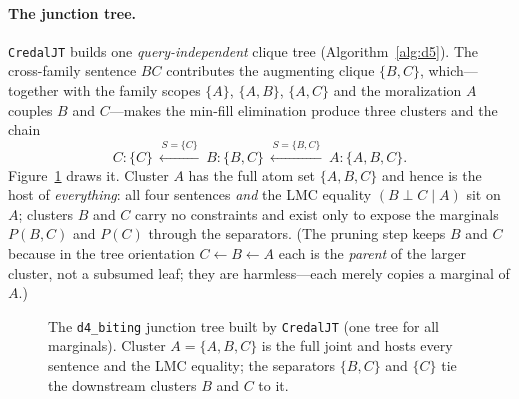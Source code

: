 \documentclass[11pt]{article}
\begin{document}
\paragraph{The junction tree.} \texttt{CredalJT} builds one \emph{query-independent} clique
tree (Algorithm~\ref{alg:d5}). The cross-family sentence $\mathit{BC}$ contributes the
augmenting clique $\{B,C\}$, which---together with the family scopes $\{A\}$, $\{A,B\}$,
$\{A,C\}$ and the moralization $A$ couples $B$ and $C$---makes the min-fill elimination produce
three clusters and the chain
\[
  \boxed{C:\{C\}}\ \xleftarrow{\,S=\{C\}\,}\ \boxed{B:\{B,C\}}\ \xleftarrow{\,S=\{B,C\}\,}\
  \boxed{A:\{A,B,C\}}.
\]
Figure~\ref{fig:d5-walk} draws it. Cluster $A$ has the full atom set $\{A,B,C\}$ and hence is
the host of \emph{everything}: all four sentences \emph{and} the LMC equality $(B\perp C\mid A)$
sit on $A$; clusters $B$ and $C$ carry no constraints and exist only to expose the marginals
$P(B,C)$ and $P(C)$ through the separators. (The pruning step keeps $B$ and $C$ because in the
tree orientation $C\leftarrow B\leftarrow A$ each is the \emph{parent} of the larger cluster, not
a subsumed leaf; they are harmless---each merely copies a marginal of $A$.)

\begin{figure}[t]
\centering
{}
\caption{The \texttt{d4\_biting} junction tree built by \texttt{CredalJT} (one tree for all
  marginals). Cluster $A=\{A,B,C\}$ is the full joint and hosts every sentence and the LMC
  equality; the separators $\{B,C\}$ and $\{C\}$ tie the downstream clusters $B$ and $C$ to it.}
\label{fig:d5-walk}
\end{figure}
\end{document}
